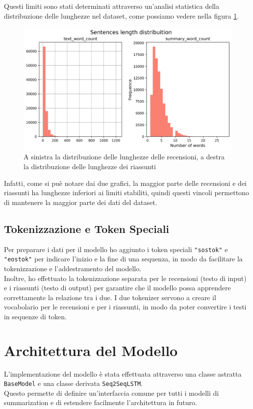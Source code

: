\documentclass[a4paper, 12pt]{article}
\begin{document}
Questi limiti sono stati determinati attraverso un'analisi statistica della distribuzione delle lunghezze nel dataset, come possiamo vedere nella figura \ref{fig:dataset_length_distribuition}.
\begin{figure}[H]
    \centering
    \includegraphics[width=1\textwidth]{media/dataset_length_distribuition.png}
    \caption{A sinistra la distribuzione delle lunghezze delle recensioni, a destra la distribuzione delle lunghezze dei riassunti}
    \label{fig:dataset_length_distribuition}
\end{figure}
Infatti, come si puè notare dai due grafici, la maggior parte delle recensioni e dei riassunti ha lunghezze inferiori ai limiti stabiliti, quindi questi vincoli permettono di mantenere la maggior parte dei dati del dataset.

\subsection{Tokenizzazione e Token Speciali}
Per preparare i dati per il modello ho aggiunto i token speciali \texttt{"sostok"} e \texttt{"eostok"} per indicare l'inizio e la fine di una sequenza, in modo da facilitare la tokenizzazione e l'addestramento del modello.\\
Inoltre, ho effettuato la tokenizzazione separata per le recensioni (testo di input) e i riassunti (testo di output) per garantire che il modello possa apprendere correttamente la relazione tra i due.
I due tokenizer servono a creare il vocabolario per le recensioni e per i riassunti, in modo da poter convertire i testi in sequenze di token.

\section{Architettura del Modello}
L'implementazione del modello è stata effettuata attraverso una classe astratta \texttt{BaseModel} e una classe derivata \texttt{Seq2SeqLSTM}.\\
Questo permette di definire un'interfaccia comune per tutti i modelli di summarization e di estendere facilmente l'architettura in futuro.\\
\end{document}
